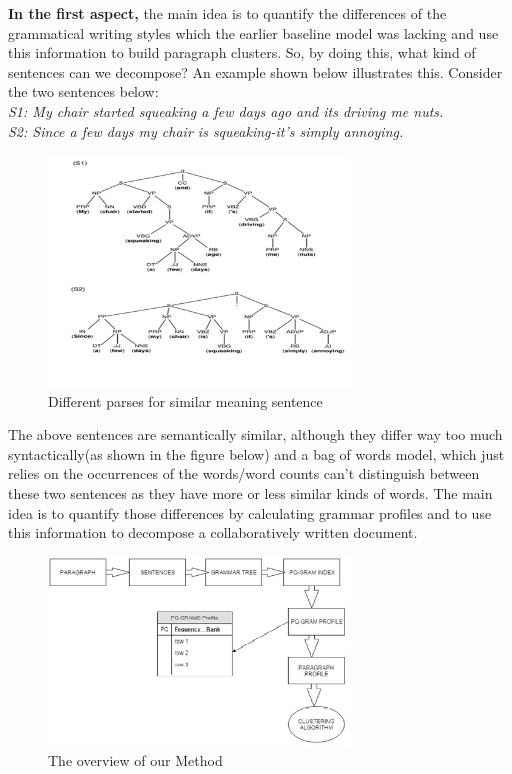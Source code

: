 \documentclass[letterpaper]{article}
\begin{document}
\textbf{In the first aspect,} the main idea is to quantify the differences of the grammatical writing styles which the earlier baseline model was lacking and use this information to build paragraph clusters. So, by doing this, what kind of sentences can we decompose? An example shown below illustrates this. Consider the two sentences below:\\
\textit{S1: My chair started squeaking a few days ago and its driving me nuts.\\
S2: Since a few days my chair is squeaking-it’s simply annoying.\\}
\begin{figure}[H]
\caption{Different parses for similar meaning sentence}
\includegraphics[width=8cm]{u2.jpg}
\end{figure}
The above sentences are semantically similar, although they differ way too much syntactically(as shown in the figure below) and a bag of words model, which just relies on the occurrences of the words/word counts can’t distinguish between these two sentences as they have more or less similar kinds of words. The main idea is to quantify those differences by calculating grammar profiles and to use this information to decompose a collaboratively written document.
\begin{figure}[H]

\caption{The overview of our Method}
\includegraphics[width=8cm]{u3.jpg}

\end{figure}
\end{document}
